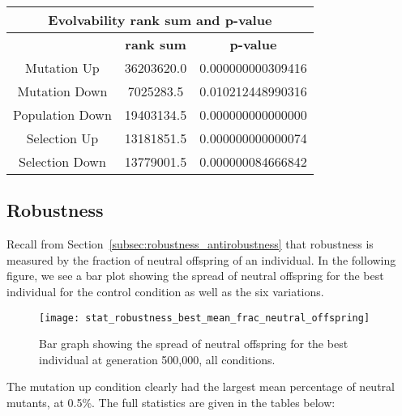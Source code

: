 \begin{table}[H]
	\begin{tabular}{|c|c|c|}
		\hline
		\multicolumn{3}{|c|}{\Large \textbf{Evolvability rank sum and p-value}} \\
		\hline
		 & \textbf{rank sum} & \textbf{p-value} \\
		 \hline
		Mutation Up & 36203620.0 & 0.000000000309416 \\
		\hline
		Mutation Down & 7025283.5 & 0.010212448990316 \\
		\hline
		Population Down & 19403134.5 & 0.000000000000000\\
		\hline
		Selection Up & 13181851.5 & 0.000000000000074 \\
		\hline
		Selection Down & 13779001.5 & 0.000000084666842 \\
		\hline
	\end{tabular}
\end{table}
\subsection{Robustness}
Recall from Section~\ref{subsec:robustness_antirobustness} that robustness is measured by the fraction of neutral offspring of an individual. In the following figure, we see a bar plot showing the spread of neutral offspring for the best individual for the control condition as well as the six variations. 

\begin{figure}[H]
	\centering
	\texttt{[image: stat\_robustness\_best\_mean\_frac\_neutral\_offspring]}
	\caption[Robustness bar graph]{Bar graph showing the spread of neutral offspring for the best individual at generation 500,000, all conditions.}
	\label{fig:mean_robustness_all_conditions}
\end{figure}
The mutation up condition clearly had the largest mean percentage of neutral mutants, at 0.5\%. The full statistics are given in the tables below:

